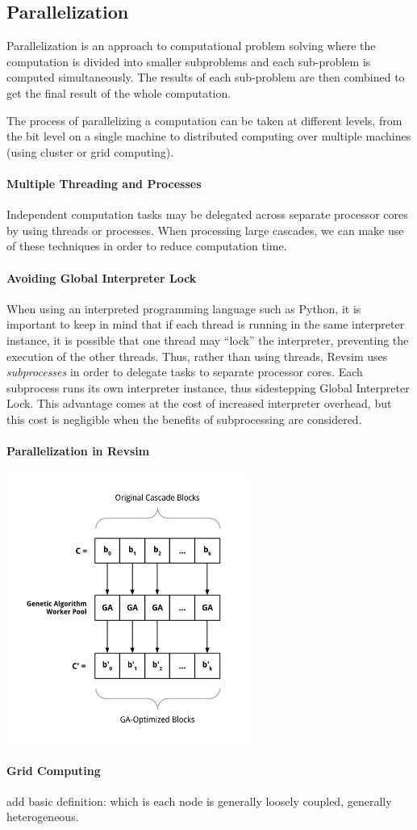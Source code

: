 \subsection{Parallelization}

Parallelization is an approach to computational problem solving where the computation is divided into smaller 
subproblems and each sub-problem is computed simultaneously. The results of each sub-problem are then combined 
to get the final result of the whole computation.

The process of parallelizing a computation can be taken at different levels, from the bit level on a single machine 
to distributed computing over multiple machines (using cluster or grid computing).

\paragraph{Multiple Threading and Processes} Independent computation tasks may be delegated across separate processor cores by using threads or processes. When processing large cascades, we can make use of these techniques in order to reduce computation time.

\paragraph{Avoiding Global Interpreter Lock} When using an interpreted programming language such as Python, it is important to keep in mind that if each thread is running in the same interpreter instance, it is possible that one thread may ``lock'' the interpreter, preventing the execution of the other threads. Thus, rather than using threads, Revsim uses \emph{subprocesses} in order to delegate tasks to separate processor cores. Each subprocess runs its own interpreter instance, thus sidestepping Global Interpreter Lock. This advantage comes at the cost of increased interpreter overhead, but this cost is negligible when the benefits of subprocessing are considered. 

\paragraph{Parallelization in Revsim} 
\begin{center}
 \includegraphics[width=80mm]{diagrams/parallelization.png}
\end{center}


\paragraph{Grid Computing}
add basic definition: which is each node is generally loosely coupled, generally heterogeneous.